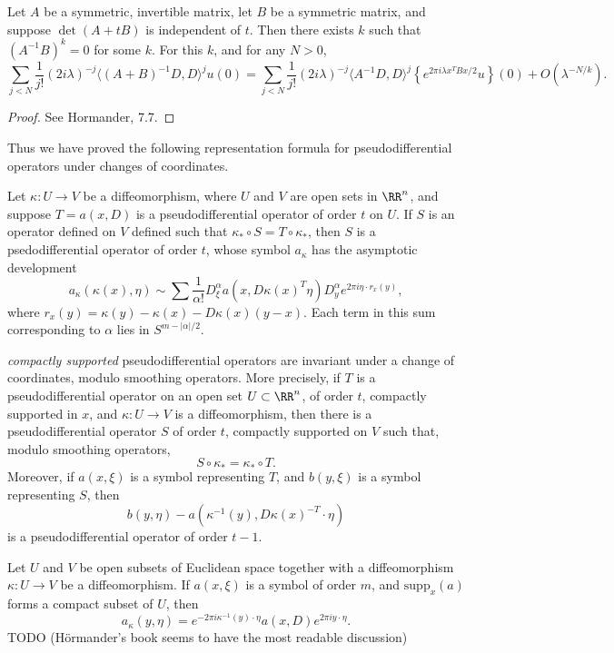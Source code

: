 \begin{lemma}
    Let $A$ be a symmetric, invertible matrix, let $B$ be a symmetric matrix, and suppose $\det(A + tB)$ is independent of $t$. Then there exists $k$ such that $(A^{-1}B)^k = 0$ for some $k$. For this $k$, and for any $N > 0$,
    \[ \sum_{j < N} \frac{1}{j!} (2 i \lambda)^{-j} \langle (A + B)^{-1} D, D \rangle^j u(0) = \sum_{j < N} \frac{1}{j!} (2 i \lambda)^{-j} \langle A^{-1}D, D \rangle^j \left\{ e^{2 \pi i \lambda x^T B x / 2} u \right\}(0) + O(\lambda^{-N/k}). \]
\end{lemma}
\begin{proof}
    See Hormander, 7.7.
\end{proof}

Thus we have proved the following representation formula for pseudodifferential operators under changes of coordinates.

\begin{theorem}
    Let $\kappa: U \to V$ be a diffeomorphism, where $U$ and $V$ are open sets in $\RR^n$, and suppose $T = a(x,D)$ is a pseudodifferential operator of order $t$ on $U$. If $S$ is an operator defined on $V$ defined such that $\kappa_* \circ S = T \circ \kappa_*$, then $S$ is a psedodifferential operator of order $t$, whose symbol $a_\kappa$ has the asymptotic development
    \[ a_\kappa(\kappa(x),\eta) \sim \sum \frac{1}{\alpha!} D^\alpha_\xi a(x,D\kappa(x)^T \eta) D^\alpha_y e^{2\pi i \eta \cdot r_x(y)}, \]
    where $r_x(y) = \kappa(y) - \kappa(x) - D\kappa(x)(y-x)$. Each term in this sum corresponding to $\alpha$ lies in $S^{m-|\alpha|/2}$.
\end{theorem}



\emph{compactly supported} pseudodifferential operators are invariant under a change of coordinates, modulo smoothing operators. More precisely, if $T$ is a pseudodifferential operator on an open set $U \subset \RR^n$, of order $t$, compactly supported in $x$, and $\kappa: U \to V$ is a diffeomorphism, then there is a pseudodifferential operator $S$ of order $t$, compactly supported on $V$ such that, modulo smoothing operators,
%
\[ S \circ \kappa_* = \kappa_* \circ T. \]
%
Moreover, if $a(x,\xi)$ is a symbol representing $T$, and $b(y,\xi)$ is a symbol representing $S$, then
%
\[ b(y,\eta) - a(\kappa^{-1}(y), D\kappa(x)^{-T} \cdot \eta) \]
%
is a pseudodifferential operator of order $t - 1$.

\begin{theorem}
    Let $U$ and $V$ be open subsets of Euclidean space together with a diffeomorphism $\kappa: U \to V$ be a diffeomorphism. If $a(x,\xi)$ is a symbol of order $m$, and $\text{supp}_x(a)$ forms a compact subset of $U$, then
    \[ a_\kappa(y,\eta) = e^{-2 \pi i \kappa^{-1}(y) \cdot \eta} a(x,D) e^{2 \pi i y \cdot \eta}. \]
    TODO (H\"{o}rmander's book seems to have the most readable discussion)
\end{theorem}

